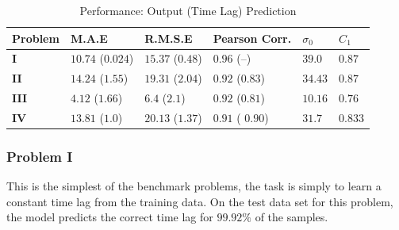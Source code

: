 \documentclass[envcountsect,runningheads]{llncs}
\theoremstyle{etoile}
\begin{document}
\begin{table}
  \caption{Performance: Output (Time Lag) Prediction}\label{tab:results_syn}
  \centering
  \begin{tabular}{ l l l l l l}
  \hline
  Problem &  M.A.E & R.M.S.E & Pearson Corr. & $\sigma_0$ & $C_1$\\
  \hline
  \textbf{I} & $10.74$ ($0.024$)  & $15.37$ ($0.48$) & $0.96$ (--) & $39.0$ & $0.87$\\
  \textbf{II} & $14.24$ ($1.55$) & $19.31$ ($2.04$) & $0.92$ ($0.83$) & $34.43$ & $0.87$\\
  \textbf{III} & $4.12$ ($1.66$) & $6.4$ ($2.1$) & $0.92$ ($0.81$) & $10.16$ & $0.76$\\
  \textbf{IV} & $13.81$ ($1.0$) & $20.13$ ($1.37$) & $0.91$ ( $0.90$) & $31.7$ & $0.833$\\
  \hline
  \end{tabular}
\end{table}


\subsubsection{Problem I}

This is the simplest of the benchmark problems, the task is simply to learn a constant time lag from 
the training data. On the test data set for this problem, the model predicts the correct time lag for 
$99.92\%$ of the samples.
\end{document}
